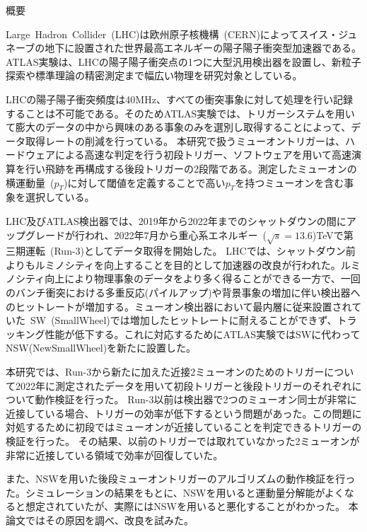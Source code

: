 \begin{center}
  \begin{huge}
    概要
  \end{huge}
\end{center}

\vspace{10pt}

Large~Hadron~Collider~(LHC)は欧州原子核機構~(CERN)によってスイス・ジュネーブの地下に設置された世界最高エネルギーの陽子陽子衝突型加速器である。ATLAS実験は、LHCの陽子陽子衝突点の1つに大型汎用検出器を設置し、新粒子探索や標準理論の精密測定まで幅広い物理を研究対象としている。

LHCの陽子陽子衝突頻度は40MHz、すべての衝突事象に対して処理を行い記録することは不可能である。そのためATLAS実験では、トリガーシステムを用いて膨大のデータの中から興味のある事象のみを選別し取得することによって、データ取得レートの削減を行っている。
本研究で扱うミューオントリガーは、ハードウェアによる高速な判定を行う初段トリガー、ソフトウェアを用いて高速演算を行い飛跡を再構成する後段トリガーの2段階である。測定したミューオンの横運動量~($p_{T}$)に対して閾値を定義することで高い$p_{T}$を持つミューオンを含む事象を選択している。

LHC及びATLAS検出器では、2019年から2022年までのシャットダウンの間にアップグレードが行われ、2022年7月から重心系エネルギー~($\sqrt{s}=13.6$)TeVで第三期運転~(Run-3)としてデータ取得を開始した。
LHCでは、シャットダウン前よりもルミノシティを向上することを目的として加速器の改良が行われた。ルミノシティ向上により物理事象のデータをより多く得ることができる一方で、一回のバンチ衝突における多重反応(パイルアップ)や背景事象の増加に伴い検出器へのヒットレートが増加する。ミューオン検出器において最内層に従来設置されていた~SW~(SmallWheel)では増加したヒットレートに耐えることができず、トラッキング性能が低下する。これに対応するためにATLAS実験ではSWに代わってNSW(NewSmallWheel)を新たに設置した。


本研究では、Run-3から新たに加えた近接2ミューオンのためのトリガーについて2022年に測定されたデータを用いて初段トリガーと後段トリガーのそれぞれについて動作検証を行った。
Run-3以前は検出器で2つのミューオン同士が非常に近接している場合、トリガーの効率が低下するという問題があった。この問題に対処するために初段ではミューオンが近接していることを判定できるトリガーの検証を行った。
その結果、以前のトリガーでは取れていなかった2ミューオンが非常に近接している領域で効率が回復していた。

また、NSWを用いた後段ミューオントリガーのアルゴリズムの動作検証を行った。シミュレーションの結果をもとに、NSWを用いると運動量分解能がよくなると想定されていたが、実際にはNSWを用いると悪化することがわかった。
本論文ではその原因を調べ、改良を試みた。